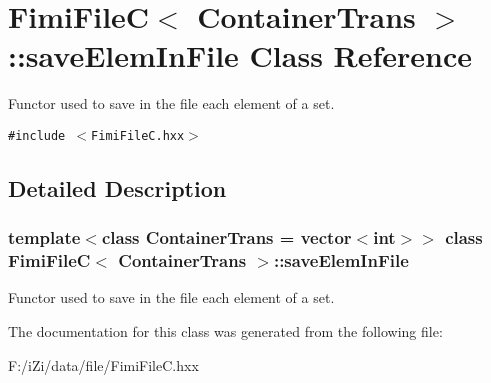 \section{Fimi\-File\-C$<$ Container\-Trans $>$::save\-Elem\-In\-File Class Reference}
\label{class_fimi_file_c_1_1save_elem_in_file}
Functor used to save in the file each element of a set.  


{\tt \#include $<$Fimi\-File\-C.hxx$>$}



\subsection{Detailed Description}
\subsubsection*{template$<$class Container\-Trans = vector$<$int$>$$>$ class Fimi\-File\-C$<$ Container\-Trans $>$::save\-Elem\-In\-File}

Functor used to save in the file each element of a set. 



The documentation for this class was generated from the following file:\begin{CompactItemize}
\item 
F:/i\-Zi/data/file/Fimi\-File\-C.hxx\end{CompactItemize}
